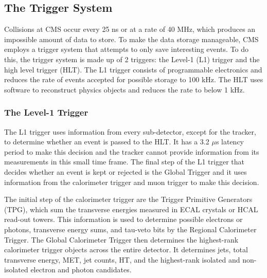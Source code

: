 

\subsection{The Trigger System}

Collisions at CMS occur every 25 ns or at a rate of 40 MHz, which produces an impossible amount of data to store. To make the data storage manageable, CMS employs a trigger system that attempts to only save interesting events. To do this, the trigger system is made up of 2 triggers: the Level-1 (L1) trigger and the high level trigger (HLT). The L1 trigger consists of programmable electronics and reduces the rate of events accepted for possible storage to 100 kHz. The HLT uses software to reconstruct physics objects and reduces the rate to below 1 kHz. 

\subsubsection{The Level-1 Trigger}

The L1 trigger uses information from every sub-detector, except for the tracker, to determine whether an event is passed to the HLT. It has a 3.2 $\mu$s latency period to make this decision and the tracker cannot provide information from its measurements in this small time frame.  The final step of the L1 trigger that decides whether an event is kept or rejected is the Global Trigger and it uses information from the calorimeter trigger and muon trigger to make this decision.

The initial step of the calorimeter trigger are the Trigger Primitive Generators (TPG), which sum the transverse energies measured in ECAL crystals or HCAL read-out towers. This information is used to determine possible electrons or photons, transverse energy sums, and tau-veto bits by the Regional Calorimeter Trigger. The Global Calorimeter Trigger then determines the highest-rank calorimeter trigger objects across the entire detector. It determines jets, total transverse energy, MET, jet counts, HT, and the highest-rank isolated and non-isolated electron and photon candidates.


